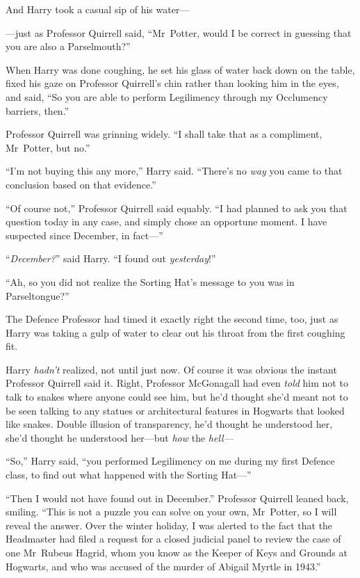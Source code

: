 And Harry took a casual sip of his water—

—just as Professor Quirrell said,
“Mr~Potter, would I be correct in guessing that you are also a Parselmouth?”

When Harry was done coughing, he set his glass of water back down on the table, fixed his gaze on Professor Quirrell’s chin rather than looking him in the eyes, and said,
“So you are able to perform Legilimency through my Occlumency barriers, then.”

Professor Quirrell was grinning widely.
“I shall take that as a compliment, Mr~Potter, but no.”

“I’m not buying this any more,” Harry said.
“There’s no \emph{way} you came to that conclusion based on that evidence.”

“Of course not,” Professor Quirrell said equably.
“I had planned to ask you that question today in any case, and simply chose an opportune moment. I have suspected since December, in fact—”

“\emph{December?}” said Harry.
“I found out \emph{yesterday}!”

“Ah, so you did not realize the Sorting Hat’s message to you was in Parseltongue?”

The Defence Professor had timed it exactly right the second time, too, just as Harry was taking a gulp of water to clear out his throat from the first coughing fit.

Harry \emph{hadn’t} realized, not until just now. Of course it was obvious the instant Professor Quirrell said it. Right, Professor McGonagall had even \emph{told} him not to talk to snakes where anyone could see him, but he’d thought she’d meant not to be seen talking to any statues or architectural features in Hogwarts that looked like snakes. Double illusion of transparency, he’d thought he understood her, she’d thought he understood her—but \emph{how} the \emph{hell—}

“So,” Harry said, “you performed Legilimency on me during my first Defence class, to find out what happened with the Sorting Hat—”

“Then I would not have found out in December.” Professor Quirrell leaned back, smiling.
“This is not a puzzle you can solve on your own, Mr~Potter, so I will reveal the answer. Over the winter holiday, I was alerted to the fact that the Headmaster had filed a request for a closed judicial panel to review the case of one Mr~Rubeus Hagrid, whom you know as the Keeper of Keys and Grounds at Hogwarts, and who was accused of the murder of Abigail Myrtle in 1943.”

